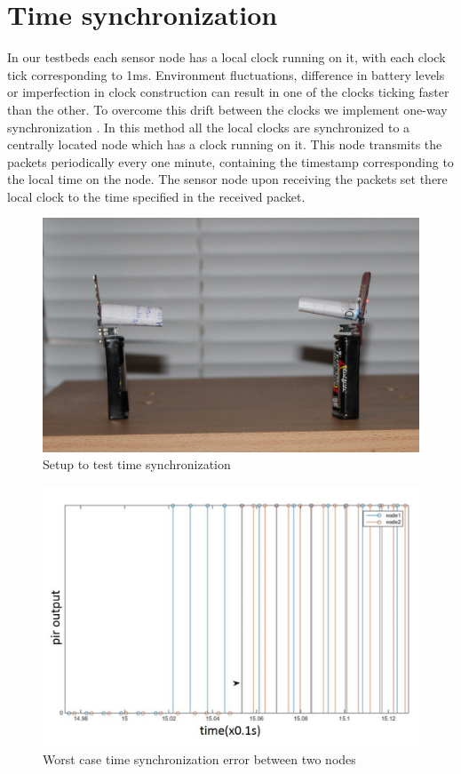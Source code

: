 \section{Time synchronization}
In our testbeds each sensor node has a local clock running on it, with each clock tick corresponding to 1ms. Environment fluctuations, difference in battery levels or imperfection in clock construction can result in one of the clocks ticking faster than the other. To overcome this drift between the clocks we implement one-way synchronization \cite{kerkez2012adaptive}. In this method all the local clocks are synchronized to a centrally located node which has a clock running on it. This node transmits the packets periodically every one minute, containing the timestamp corresponding to the local time on the node. The sensor node upon receiving the packets set there local clock to the time specified in the received packet. 
\begin{figure}[!ht]
\includegraphics[scale=0.1]{./pics/timesync.jpg}
\caption{Setup to test time synchronization}
\label{fig:timeSync}
\end{figure}

\begin{figure}
\includegraphics[scale=0.5]{./pics/timeSyncErr}
\caption{Worst case time synchronization error between two nodes}
\label{fig:timeSyncErr}
\end{figure}

